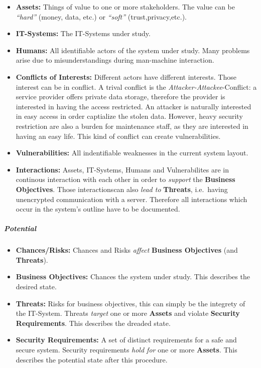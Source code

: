 \begin{itemize}
\itemsep1pt\parskip0pt
\item
  \textbf{Assets:} Things of value to one or more stakeholders. The
  value can be \emph{``hard''} (money, data, etc.) or \emph{``soft''}
  (trust,privacy,etc.).
\item
  \textbf{IT-Systems:} The IT-Systems under study.
\item
  \textbf{Humans:} All identifiable actors of the system under study.
  Many problems arise due to misunderstandings during man-machine
  interaction.
\item
  \textbf{Conflicts of Interests:} Different actors have different
  interests. Those interest can be in conflict. A trival conflict is the
  \emph{Attacker-Attackee}-Conflict: a service provider offers private
  data storage, therefore the provider is interested in having the
  access restricted. An attacker is naturally interested in easy access
  in order captialize the stolen data. However, heavy security
  restriction are also a burden for maintenance staff, as they are
  interested in having an easy life. This kind of conflict can create
  vulnerabilities.
\item
  \textbf{Vulnerabilities:} All indentifiable weaknesses in the current
  system layout.
\item
  \textbf{Interactions:} Assets, IT-Systems, Humans and Vulnerabilites
  are in continous interaction with each other in order to
  \emph{support} the \textbf{Business Objectives}. Those interactionscan
  also \emph{lead to} \textbf{Threats}, i.e.~having unencrypted
  communication with a server. Therefore all interactions which occur in
  the system's outline have to be documented.
\end{itemize}

\subparagraph{Potential}

\begin{itemize}
\itemsep1pt\parskip0pt
\item
  \textbf{Chances/Risks:} Chances and Risks \emph{affect}
  \textbf{Business Objectives} (and \textbf{Threats}).
\item
  \textbf{Business Objectives:} Chances the system under study. This
  describes the desired state.
\item
  \textbf{Threats:} Risks for business objectives, this can simply be
  the integrety of the IT-System. Threats \emph{target} one or more
  \textbf{Assets} and violate \textbf{Security Requirements}. This
  describes the dreaded state.
\item
  \textbf{Security Requirements:} A set of distinct requirements for a
  safe and secure system. Security requirements \emph{hold for} one or
  more \textbf{Assets}. This describes the potential state after this
  procedure.
\end{itemize}

